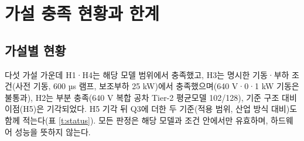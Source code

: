 \chapter{가설 충족 현황과 한계}

\section{가설별 현황}

다섯 가설 가운데 H1·H4는 해당 모델 범위에서 충족했고, H3는 명시한 기동·부하 조건(사전 기동, 600 µs 램프, 보조부하 25 kW)에서 충족했으며(640 V·0·1 kW 기동은 불통과), H2는 부분 충족(640 V 복합 공차 Tier-2 평균모델 102/128), 기준 구조 대비 이점(H5)은 기각되었다. H5 기각 뒤 Q3에 더한 두 기준(적용 범위, 산업 방식 대비)도 함께 적는다(표 \ref{t:status}). 모든 판정은 해당 모델과 조건 안에서만 유효하며, 하드웨어 성능을 뜻하지 않는다.


